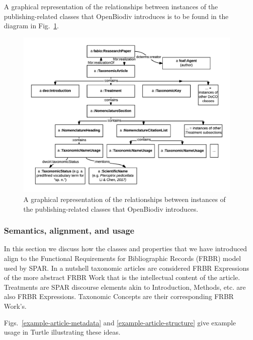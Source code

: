A graphical representation of the relationships between instances of the publishing-related classes that OpenBiodiv introduces is to be found in the diagram in Fig.~\ref{taxonomic-article-diagram}.

\begin{figure}[h!]
	\centering
	\includegraphics[width=\textwidth]{Figures/taxonomic-article-diagram}
	\decoRule
  \caption[Taxonomic article diagram.]{A graphical representation of the relationships between instances of the publishing-related classes that OpenBiodiv introduces.}
  \label{taxonomic-article-diagram}
\end{figure}

\subsubsection{Semantics, alignment, and usage}

In this section we discuss how the classes and properties that we have introduced align to the Functional Requirements for Bibliographic Records (FRBR) model used by SPAR. In a nutshell taxonomic articles are considered FRBR Expressions of the more abstract FRBR Work that is the intellectual content of the article. Treatments are SPAR discourse elements akin to Introduction, Methods, etc. are also FRBR Expressions. Taxonomic Concepts are their corresponding FRBR Work's.

Figs.~\ref{example-article-metadata} and \ref{example-article-structure} give example usage in Turtle illustrating these ideas.

